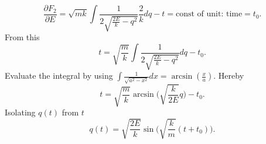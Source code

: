 \begin{example}
	\begin{equation}
		\frac{\partial F_2}{\partial E}=\sqrt{mk}\int\frac{1}{2\sqrt{\frac{2E}{k}-q^2}}\frac{2}{k}dq-t=\text{const of unit: time}=t_0. 
	\end{equation} 
	From this
	\begin{equation}
		t=\sqrt{\frac{m}{k}}\int\frac{1}{2\sqrt{\frac{2E}{k}-q^2}}dq-t_0.
	\end{equation} 
	Evaluate the integral by using $\int \frac{1}{\sqrt{a^2-x^2}}dx=\arcsin(\frac{x}{a})$. Hereby
	\begin{equation}
		t=\sqrt{\frac{m}{k}}\arcsin\bigg(\sqrt{\frac{k}{2E}}q\bigg)-t_0.
	\end{equation} 
	Isolating $q(t)$ from $t$
	\begin{equation}
		q(t)=\sqrt{\frac{2E}{k}}\sin\bigg(\sqrt{\frac{k}{m}}(t+t_0)\bigg).
	\end{equation} 
\end{example}
